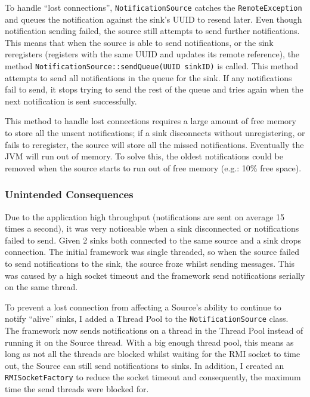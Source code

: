 \documentclass[a4paper]{article}
\begin{document}
To handle ``lost connections'', \texttt{NotificationSource} catches the \texttt{RemoteException} and queues the notification against the sink's UUID to resend later.
Even though notification sending failed, the source still attempts to send further notifications.
This means that when the source is able to send notifications, or the sink reregisters (registers with the same UUID and updates its remote reference),
the method \texttt{NotificationSource::sendQueue(UUID sinkID)} is called.
This method attempts to send all notifications in the queue for the sink.
If any notifications fail to send, it stops trying to send the rest of the queue and tries again when the next notification is sent successfully.

This method to handle lost connections requires a large amount of free memory to store all the unsent notifications;
 if a sink disconnects without unregistering, or fails to reregister, the source will store all the missed notifications.
Eventually the JVM will run out of memory.
To solve this, the oldest notifications could be removed when the source starts to run out of free memory (e.g.: 10\% free space).

\subsubsection{Unintended Consequences}
Due to the application high throughput (notifications are sent on average 15 times a second), it was very noticeable when a sink disconnected or notifications failed to send.
Given 2 sinks both connected to the same source and a sink drops connection.
The initial framework was single threaded, so when the source failed to send notifications to the sink, the source froze whilst sending messages.
This was caused by a high socket timeout and the framework send notifications serially on the same thread.

To prevent a lost connection from affecting a Source's ability to continue to notify ``alive'' sinks, I added a Thread Pool to the \texttt{NotificationSource} class.
The framework now sends notifications on a thread in the Thread Pool instead of running it on the Source thread.
With a big enough thread pool, this means as long as not all the threads are blocked whilst waiting for the RMI socket to time out, the Source can still send notifications to sinks.
In addition, I created an \texttt{RMISocketFactory} to reduce the socket timeout and consequently, the maximum time the send threads were blocked for.
\end{document}
